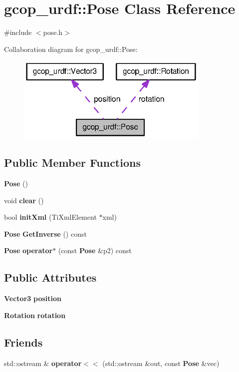 \section{gcop\-\_\-urdf\-:\-:\-Pose \-Class \-Reference}
\label{classgcop__urdf_1_1Pose}


{\ttfamily \#include $<$pose.\-h$>$}



\-Collaboration diagram for gcop\-\_\-urdf\-:\-:\-Pose\-:\nopagebreak
\begin{figure}[H]
\begin{center}
\leavevmode
\includegraphics[width=262pt]{classgcop__urdf_1_1Pose__coll__graph}
\end{center}
\end{figure}
\subsection*{\-Public \-Member \-Functions}
\begin{DoxyCompactItemize}
\item 
{\bf \-Pose} ()
\item 
void {\bf clear} ()
\item 
bool {\bf init\-Xml} (\-Ti\-Xml\-Element $\ast$xml)
\item 
{\bf \-Pose} {\bf \-Get\-Inverse} () const 
\item 
{\bf \-Pose} {\bf operator$\ast$} (const {\bf \-Pose} \&p2) const 
\end{DoxyCompactItemize}
\subsection*{\-Public \-Attributes}
\begin{DoxyCompactItemize}
\item 
{\bf \-Vector3} {\bf position}
\item 
{\bf \-Rotation} {\bf rotation}
\end{DoxyCompactItemize}
\subsection*{\-Friends}
\begin{DoxyCompactItemize}
\item 
std\-::ostream \& {\bf operator$<$$<$} (std\-::ostream \&out, const {\bf \-Pose} \&vec)
\end{DoxyCompactItemize}


